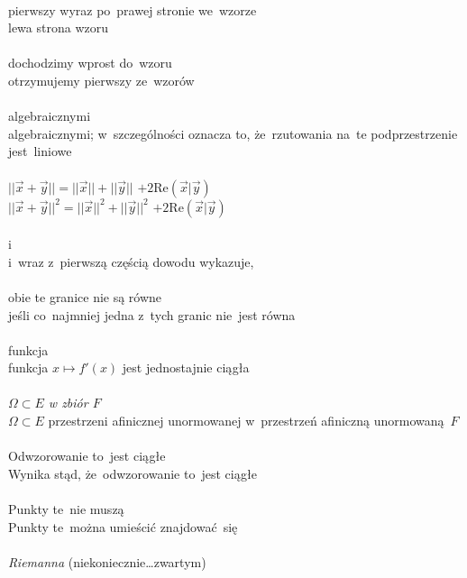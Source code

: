 \documentclass[a4paper,11pt]{article}
\begin{document}
 \\
\Jest pierwszy wyraz po~prawej stronie we~wzorze \\
\Powin  lewa strona wzoru \\
 \\
\Jest dochodzimy wprost do~wzoru \\
\Powin  otrzymujemy pierwszy ze~wzorów \\
 \\
\Jest algebraicznymi \\
\Powin algebraicznymi; w~szczególności oznacza to, że~rzutowania na~te
podprzestrzenie jest~liniowe \\
 \\
\Jest
$|| \vec{ x } + \vec{ y } || = || \vec{ x } || + || \vec{ y } ||$
$+ 2 \mathrm{Re}( \vec{ x } | \vec{ y } )$ \\
\Powin $|| \vec{ x } + \vec{ y } ||^{ 2 } = || \vec{ x } ||^{ 2 }
+ || \vec{ y } ||^{ 2 }$ $+ 2 \mathrm{Re}( \vec{ x } | \vec{ y } )$ \\
 \\
\Jest i \\
\Powin i~wraz z~pierwszą częścią dowodu wykazuje, \\
 \\
\Jest obie te granice nie są równe \\
\Powin  jeśli co~najmniej jedna z~tych granic nie~jest równa \\
 \\
\Jest funkcja \\
\Powin  funkcja $x \mapsto f'( x )$ jest jednostajnie ciągła \\
 \\
\Jest \emph{$\Omega \subset E$ w zbiór $F$} \\
\Powin $\Omega \subset E$ przestrzeni afinicznej unormowanej w~przestrzeń
afiniczną unormowaną~$F$ \\
 \\
\Jest Odwzorowanie to~jest ciągłe \\
\Powin  Wynika stąd, że~odwzorowanie to~jest ciągłe \\
 \\
\Jest Punkty te~nie muszą \\
\Powin  Punkty te~można umieścić znajdować~się \\
 \\
\Jest \emph{Riemanna} (niekoniecznie\ldots zwartym) \\
\end{document}
